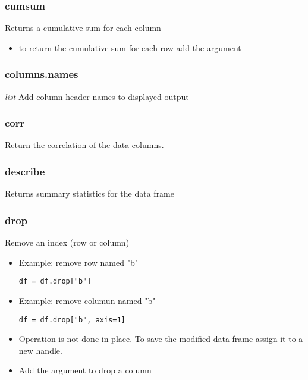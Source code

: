 %
\subsubsection{cumsum}
Returns a cumulative sum for each column
  \begin{itemize}

    \item to return the cumulative sum for each row add the argument
      \color{red}{axis=1}
  \end{itemize}

%
\subsubsection{columns.names}
\textit{list} Add column header names to displayed output

%
\subsubsection{corr}
Return the correlation of the data columns.

%
\subsubsection{describe}
Returns summary statistics for the data frame

%
\subsubsection{drop}
Remove an index (row or column)
  \begin{itemize}

    \item Example: remove row named "b"
\begin{lstlisting}
df = df.drop["b"]
\end{lstlisting}

    \item Example: remove columun named "b"
\begin{lstlisting}
df = df.drop["b", axis=1]
\end{lstlisting}

    \item Operation is not done in place.  To save the modified data frame
      assign it to a new handle.

    \item Add the argument \color{red}{axis=1} to drop a column
  \end{itemize}

